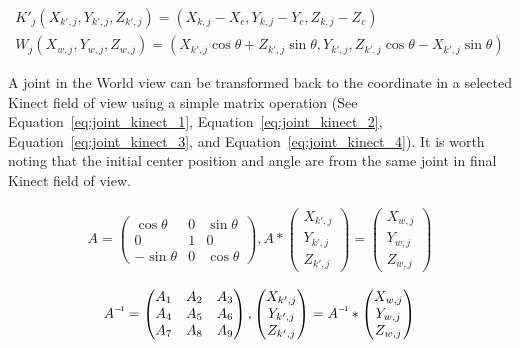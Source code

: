 \begin{equation}
\label{eq:joint_worldview}
\begin{gathered}
K'_j(X_{k',j}, Y_{k',j}, Z_{k',j}) = (X_{k,j}-X_c, Y_{k,j}-Y_c, Z_{k,j}-Z_c) \\
W_j(X_{w,j}, Y_{w,j}, Z_{w,j}) = (X_{k',j}\cos\theta+Z_{k',j}\sin\theta, Y_{k',j}, Z_{k',j}\cos\theta-X_{k',j}\sin\theta)
\end{gathered}
\end{equation}

A joint in the World view can be transformed back to the coordinate in a selected Kinect field of view using a simple matrix operation (See Equation~\ref{eq:joint_kinect_1}, Equation~\ref{eq:joint_kinect_2}, Equation~\ref{eq:joint_kinect_3}, and Equation~\ref{eq:joint_kinect_4}). It is worth noting that the initial center position and angle are from the same joint in final Kinect field of view.

\begin{equation}
\label{eq:joint_kinect_1}
\begin{gathered}
  A =
  \begin{pmatrix}
  \cos\theta & 0 & \sin\theta \\
  0 & 1 & 0 \\
  -\sin\theta & 0 &  \cos\theta
  \end{pmatrix}, 
  A *
  \begin{pmatrix}
  X_{k',j} \\
  Y_{k',j} \\
  Z_{k',j}
  \end{pmatrix} =
  \begin{pmatrix}
  X_{w,j} \\
  Y_{w,j} \\
  Z_{w,j}
  \end{pmatrix}
\end{gathered}
\end{equation}

\begin{equation}
\label{eq:joint_kinect_2}
\begin{gathered}
  \inv{A} =
  \begin{pmatrix}
  A_1 & A_2 & A_3 \\
  A_4 & A_5 & A_6 \\
  A_7 & A_8 & A_9
  \end{pmatrix}, 
  \begin{pmatrix}
  X_{k',j} \\
  Y_{k',j} \\
  Z_{k',j}
  \end{pmatrix} =
  \inv{A} *
  \begin{pmatrix}
  X_{w,j} \\
  Y_{w,j} \\
  Z_{w,j}
  \end{pmatrix}
\end{gathered}
\end{equation}

